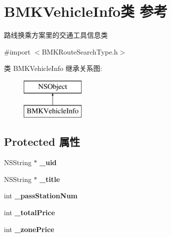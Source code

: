 \hypertarget{interface_b_m_k_vehicle_info}{\section{B\+M\+K\+Vehicle\+Info类 参考}
\label{interface_b_m_k_vehicle_info}
}


路线换乘方案里的交通工具信息类  




{\ttfamily \#import $<$B\+M\+K\+Route\+Search\+Type.\+h$>$}

类 B\+M\+K\+Vehicle\+Info 继承关系图\+:\begin{figure}[H]
\begin{center}
\leavevmode
\includegraphics[height=2.000000cm]{interface_b_m_k_vehicle_info}
\end{center}
\end{figure}
\subsection*{Protected 属性}
\begin{DoxyCompactItemize}
\item 
\hypertarget{interface_b_m_k_vehicle_info_a853ee3a522e8444b9971b49488e8400b}{N\+S\+String $\ast$ {\bfseries \+\_\+uid}}\label{interface_b_m_k_vehicle_info_a853ee3a522e8444b9971b49488e8400b}

\item 
\hypertarget{interface_b_m_k_vehicle_info_a1595d93dc64551a2aecb711a5f1beeb7}{N\+S\+String $\ast$ {\bfseries \+\_\+title}}\label{interface_b_m_k_vehicle_info_a1595d93dc64551a2aecb711a5f1beeb7}

\item 
\hypertarget{interface_b_m_k_vehicle_info_a249d923d79203f1a3a0a24edbde42e4f}{int {\bfseries \+\_\+pass\+Station\+Num}}\label{interface_b_m_k_vehicle_info_a249d923d79203f1a3a0a24edbde42e4f}

\item 
\hypertarget{interface_b_m_k_vehicle_info_af5ed718d348fa9a5763afeb849195415}{int {\bfseries \+\_\+total\+Price}}\label{interface_b_m_k_vehicle_info_af5ed718d348fa9a5763afeb849195415}

\item 
\hypertarget{interface_b_m_k_vehicle_info_a4357a0dd3f52b78a01df9f68199fb81d}{int {\bfseries \+\_\+zone\+Price}}\label{interface_b_m_k_vehicle_info_a4357a0dd3f52b78a01df9f68199fb81d}

\end{DoxyCompactItemize}
